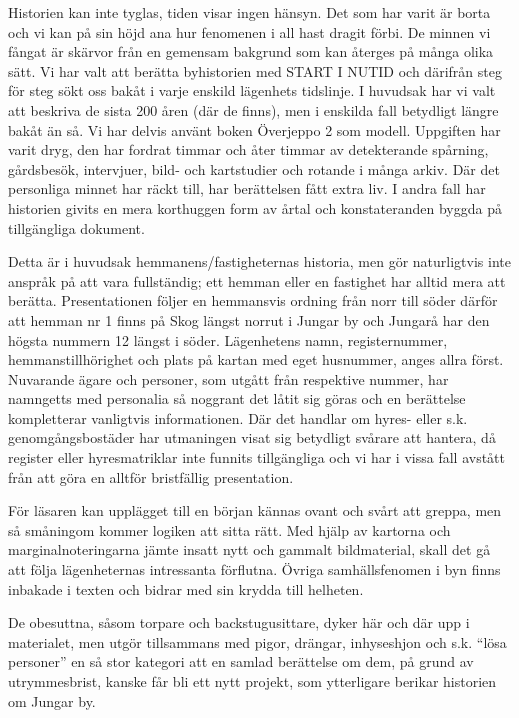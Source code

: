 
%

Historien kan inte tyglas, tiden visar ingen hänsyn. Det som har varit är borta och vi kan på sin höjd ana hur fenomenen i all hast dragit förbi. De minnen vi fångat är skärvor från en gemensam bakgrund som kan återges på många olika sätt. Vi har valt att berätta byhistorien med START I NUTID och därifrån steg för steg sökt oss bakåt i varje enskild lägenhets tidslinje. I huvudsak har vi valt att beskriva de sista 200 åren (där de finns), men i enskilda fall betydligt längre bakåt än så. Vi har delvis använt boken Överjeppo 2 som modell. Uppgiften har varit dryg, den har fordrat timmar och åter timmar av detekterande spårning, gårdsbesök, intervjuer, bild- och kartstudier och rotande i många arkiv. Där det personliga minnet har räckt till, har berättelsen fått extra liv. I andra fall har historien givits en mera korthuggen form av årtal och konstateranden byggda på tillgängliga dokument.

Detta är i huvudsak hemmanens/fastigheternas historia, men gör naturligtvis inte anspråk på att vara fullständig; ett hemman eller en fastighet har alltid mera att berätta. Presentationen följer en hemmansvis ordning från norr till söder därför  att hemman nr 1 finns på Skog längst norrut i Jungar by och Jungarå har den högsta nummern 12 längst i söder. Lägenhetens namn, registernummer, hemmanstillhörighet och plats på kartan med eget husnummer, anges allra först. Nuvarande ägare och personer, som utgått från respektive nummer, har namngetts med personalia så noggrant det låtit sig göras och en berättelse kompletterar vanligtvis informationen. Där det handlar om hyres- eller s.k. genomgångsbostäder har utmaningen visat sig betydligt svårare att hantera, då register eller hyresmatriklar inte funnits tillgängliga och vi har i vissa fall avstått från att göra en alltför bristfällig presentation.

För läsaren kan upplägget till en början kännas ovant och svårt att greppa, men så småningom kommer logiken att sitta rätt. Med hjälp av kartorna och marginalnoteringarna jämte insatt nytt och gammalt bildmaterial, skall det gå att följa lägenheternas intressanta förflutna. Övriga samhällsfenomen i byn finns inbakade i texten och bidrar med sin krydda till helheten.

De obesuttna, såsom torpare och backstugusittare, dyker här och där upp i materialet, men utgör tillsammans med pigor, drängar, inhyseshjon och s.k. ``lösa personer'' en så stor kategori att en samlad berättelse om dem, på grund av utrymmesbrist,  kanske får bli ett nytt projekt, som ytterligare berikar historien om Jungar by.

